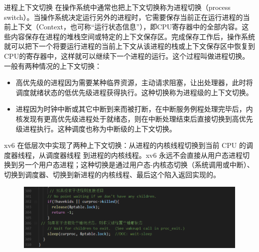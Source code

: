 \documentclass[a4paper,12pt]{report}
\begin{document}
进程上下文切换
 在操作系统中通常也把上下文切换称为进程切换（process switch）。当操作系统决定运行另外的进程时，它需要保存当前正在运行进程的当前上下文（Context，也可称“运行状态信息”），即CPU寄存器中的全部内容。这些内容保存在进程的堆栈空间或特定的上下文保存区。完成保存工作后，操作系统就可以把下一个将要运行进程的当前上下文从该进程的栈或上下文保存区中恢复到CPU的寄存器中，这样就可以继续下一个进程的运行。这个过程叫做进程切换。一般有两种情况的上下文切换：
\begin{itemize}
  \item 	高优先级的进程因为需要某种临界资源，主动请求阻塞，让出处理器，此时将调度就绪状态的低优先级进程获得执行。这种切换称为进程级的上下文切换。
  \item 	进程因为时钟中断或其它中断到来而被打断，在中断服务例程处理完毕后，内核发现有更高优先级进程处于就绪态，则在中断处理结束后直接切换到高优先级进程执行。这种调度也称为中断级的上下文切换。
\end{itemize}



xv6 在低层次中实现了两种上下文切换：从进程的内核线程切换到当前 CPU 的调度器线程，从调度器线程
到进程的内核线程。xv6 永远不会直接从用户态进程切换到另一个用户态进程；这种切换是通过用户态-内核态切换（系统调用或中断）、切换到调度器、切换到新进程的内核线程、最后这个陷入返回实现的。

\begin{figure}[H]
	\centering
	\includegraphics [width=1.0\textwidth]{figure//image114.png}
\end{figure}
\end{document}
